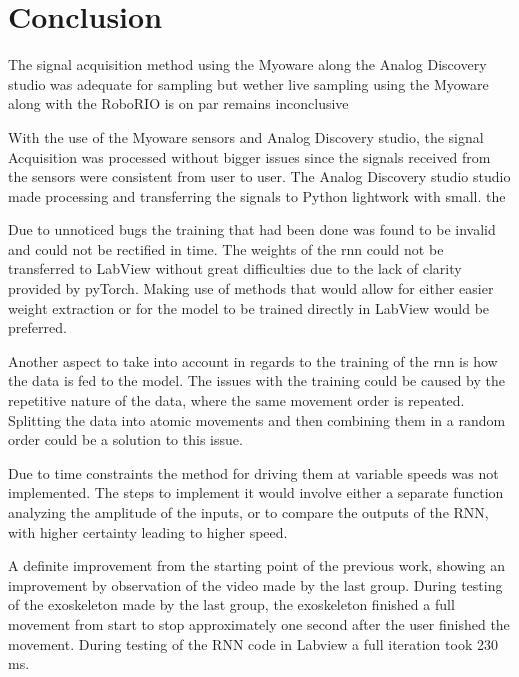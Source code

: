 \section{Conclusion}

The signal acquisition method using the Myoware along the Analog Discovery studio was adequate for sampling but wether live sampling using the Myoware along with the RoboRIO is on par remains inconclusive 


With the use of the Myoware sensors and Analog Discovery studio, the signal Acquisition was processed without bigger issues since the signals received from the sensors were consistent from user to user. 
The Analog Discovery studio studio made processing and transferring the signals to Python lightwork with small. the 

Due to unnoticed bugs the training that had been done was found to be invalid and could not be rectified in time.
The weights of the \acrshort{rnn} could not be transferred to LabView without great difficulties due to the lack of clarity provided by
pyTorch. Making use of methods that would allow for either easier weight extraction or for the model to be trained
directly in LabView would be preferred.

Another aspect to take into account in regards to the training of the \acrshort{rnn} is how the data is fed to the model. The issues
with the training could be caused by the repetitive nature of the data, where the same movement order is repeated. Splitting the data
into atomic movements and then combining them in a random order could be a solution to this issue.

Due to time constraints the method for driving them at variable speeds was not implemented. The steps to implement it
would involve either a separate function analyzing the amplitude of the inputs, or to compare the outputs of the RNN,
with higher certainty leading to higher speed.

A definite improvement from the starting point of the previous work, showing an improvement by observation of the video made by the last group. During testing of the exoskeleton made by the last group,
the exoskeleton finished a full movement from start to stop approximately one second after the user finished the movement. During testing of the RNN code in Labview a full iteration took 230 ms.

